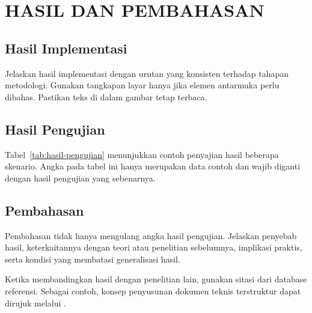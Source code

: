 \chapter{HASIL DAN PEMBAHASAN}


\section{Hasil Implementasi}

Jelaskan hasil implementasi dengan urutan yang konsisten terhadap tahapan metodologi. Gunakan tangkapan layar hanya jika elemen antarmuka perlu dibahas. Pastikan teks di dalam gambar tetap terbaca.

\section{Hasil Pengujian}

Tabel~\ref{tab:hasil-pengujian} menunjukkan contoh penyajian hasil beberapa skenario. Angka pada tabel ini hanya merupakan data contoh dan wajib diganti dengan hasil pengujian yang sebenarnya.



\section{Pembahasan}

Pembahasan tidak hanya mengulang angka hasil pengujian. Jelaskan penyebab hasil, keterkaitannya dengan teori atau penelitian sebelumnya, implikasi praktis, serta kondisi yang membatasi generalisasi hasil.

Ketika membandingkan hasil dengan penelitian lain, gunakan sitasi dari database referensi. Sebagai contoh, konsep penyusunan dokumen teknis terstruktur dapat dirujuk melalui \cite{lamport1994}.
